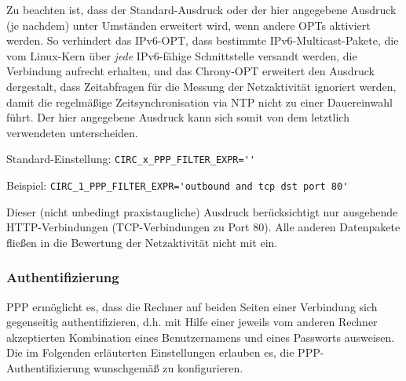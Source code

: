 \begin{description}
Zu beachten ist, dass der Standard-Ausdruck oder der hier angegebene Ausdruck
(je nachdem) unter Umständen erweitert wird, wenn andere OPTs aktiviert werden.
So verhindert das IPv6-OPT, dass bestimmte IPv6-Multicast-Pakete, die vom
Linux-Kern über \emph{jede} IPv6-fähige Schnittstelle versandt werden, die
Verbindung aufrecht erhalten, und das Chrony-OPT erweitert den Ausdruck
dergestalt, dass Zeitabfragen für die Messung der Netzaktivität ignoriert
werden, damit die regelmäßige Zeitsynchronisation via NTP nicht zu einer
Dauereinwahl führt. Der hier angegebene Ausdruck kann sich somit von dem
letztlich verwendeten unterscheiden.

Standard-Einstellung: \verb+CIRC_x_PPP_FILTER_EXPR=''+

Beispiel: \verb+CIRC_1_PPP_FILTER_EXPR='outbound and tcp dst port 80'+

Dieser (nicht unbedingt praxistaugliche) Ausdruck berücksichtigt nur ausgehende
HTTP-Verbindungen (TCP-Verbindungen zu Port 80). Alle anderen Datenpakete
fließen in die Bewertung der Netzaktivität nicht mit ein.

\end{description}

\subsubsection{Authentifizierung}

PPP ermöglicht es, dass die Rechner auf beiden Seiten einer Verbindung sich
gegenseitig authentifizieren, d.h. mit Hilfe einer jeweils vom anderen Rechner
akzeptierten Kombination eines Benutzernamens und eines Passworts ausweisen. Die
im Folgenden erläuterten Einstellungen erlauben es, die PPP-Authentifizierung
wunschgemäß zu konfigurieren.

